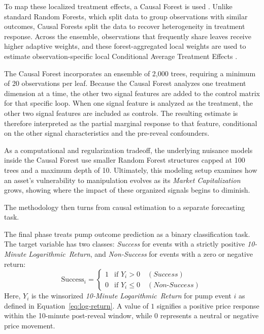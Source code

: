 To map these localized treatment effects, a Causal Forest is used \cite{athey2019generalized,econml}. Unlike standard Random Forests, which split data to group observations with similar outcomes, Causal Forests split the data to recover heterogeneity in treatment response. Across the ensemble, observations that frequently share leaves receive higher adaptive weights, and these forest-aggregated local weights are used to estimate observation-specific local Conditional Average Treatment Effects \cite{athey2019generalized,econml}.

The Causal Forest incorporates an ensemble of 2,000 trees, requiring a minimum of 20 observations per leaf. Because the Causal Forest analyzes one treatment dimension at a time, the other two signal features are added to the control matrix for that specific loop. When one signal feature is analyzed as the treatment, the other two signal features are included as controls. The resulting estimate is therefore interpreted as the partial marginal response to that feature, conditional on the other signal characteristics and the pre-reveal confounders.

As a computational and regularization tradeoff, the underlying nuisance models inside the Causal Forest use smaller Random Forest structures capped at 100 trees and a maximum depth of 10. Ultimately, this modeling setup examines how an asset's vulnerability to manipulation evolves as its \textit{Market Capitalization} grows, showing where the impact of these organized signals begins to diminish.

The methodology then turns from causal estimation to a separate forecasting task.

The final phase treats pump outcome prediction as a binary classification task. The target variable has two classes: \textit{Success} for events with a strictly positive \textit{10-Minute Logarithmic~Return}, and \textit{Non-Success} for events with a zero or negative return:
\begin{equation}
\mathrm{Success}_i =
\begin{cases}
1 & \text{if } Y_i > 0 \quad (\textit{Success}) \\
0 & \text{if } Y_i \le 0 \quad (\textit{Non-Success})
\end{cases}
\label{eq:success_definition}
\end{equation}
Here, $Y_i$ is the winsorized \textit{10-Minute Logarithmic~Return} for pump event $i$ as defined in Equation~\eqref{eq:log-return}. A value of $1$ signifies a positive price response within the 10-minute post-reveal window, while $0$ represents a neutral or negative price movement.

